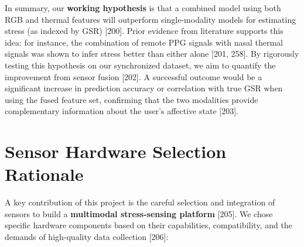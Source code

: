 \documentclass{article}
\begin{document}
    In summary, our \textbf{working hypothesis} is that a combined model using both RGB and thermal features will outperform single-modality models for estimating stress (as indexed by GSR) [200]. Prior evidence from literature supports this idea: for instance, the combination of remote PPG signals with nasal thermal signals was shown to infer stress better than either alone [201, 258]. By rigorously testing this hypothesis on our synchronized dataset, we aim to quantify the improvement from sensor fusion [202]. A successful outcome would be a significant increase in prediction accuracy or correlation with true GSR when using the fused feature set, confirming that the two modalities provide complementary information about the user’s affective state [203].

    \section{Sensor Hardware Selection Rationale}
    A key contribution of this project is the careful selection and integration of sensors to build a \textbf{multimodal stress-sensing platform} [205]. We chose specific hardware components based on their capabilities, compatibility, and the demands of high-quality data collection [206]:
\end{document}
